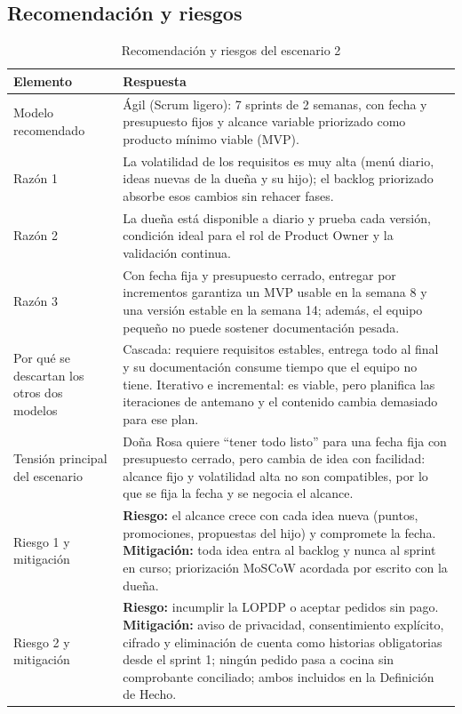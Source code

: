 \documentclass[12pt,a4paper]{article}
\begin{document}
\subsection{Recomendación y riesgos}

\begin{table}[H]
\centering
\caption{Recomendación y riesgos del escenario 2}
\small
\begin{tabularx}{\textwidth}{
    >{\raggedright\arraybackslash}p{3.5cm} Y
}
\toprule
\textbf{Elemento} & \textbf{Respuesta} \\
\midrule
Modelo recomendado & Ágil (Scrum ligero): 7 sprints de 2 semanas, con fecha y presupuesto fijos y alcance variable priorizado como producto mínimo viable (MVP). \\
\midrule
Razón 1 & La volatilidad de los requisitos es muy alta (menú diario, ideas nuevas de la dueña y su hijo); el backlog priorizado absorbe esos cambios sin rehacer fases. \\
\midrule
Razón 2 & La dueña está disponible a diario y prueba cada versión, condición ideal para el rol de Product Owner y la validación continua. \\
\midrule
Razón 3 & Con fecha fija y presupuesto cerrado, entregar por incrementos garantiza un MVP usable en la semana 8 y una versión estable en la semana 14; además, el equipo pequeño no puede sostener documentación pesada. \\
\midrule
Por qué se descartan los otros dos modelos & Cascada: requiere requisitos estables, entrega todo al final y su documentación consume tiempo que el equipo no tiene. Iterativo e incremental: es viable, pero planifica las iteraciones de antemano y el contenido cambia demasiado para ese plan. \\
\midrule
Tensión principal del escenario & Doña Rosa quiere ``tener todo listo'' para una fecha fija con presupuesto cerrado, pero cambia de idea con facilidad: alcance fijo y volatilidad alta no son compatibles, por lo que se fija la fecha y se negocia el alcance. \\
\midrule
Riesgo 1 y mitigación & \textbf{Riesgo:} el alcance crece con cada idea nueva (puntos, promociones, propuestas del hijo) y compromete la fecha. \textbf{Mitigación:} toda idea entra al backlog y nunca al sprint en curso; priorización MoSCoW acordada por escrito con la dueña. \\
\midrule
Riesgo 2 y mitigación & \textbf{Riesgo:} incumplir la LOPDP o aceptar pedidos sin pago. \textbf{Mitigación:} aviso de privacidad, consentimiento explícito, cifrado y eliminación de cuenta como historias obligatorias desde el sprint 1; ningún pedido pasa a cocina sin comprobante conciliado; ambos incluidos en la Definición de Hecho. \\
\bottomrule
\end{tabularx}
\end{table}
\end{document}
